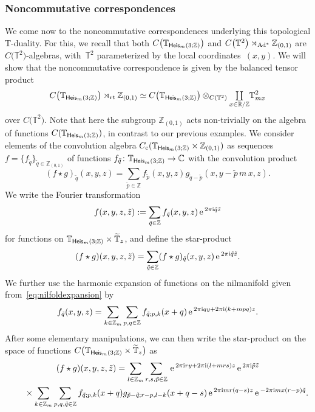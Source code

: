 \documentclass[10pt,a4paper]{amsart}
\numberwithin{equation}{section}
\def\nn{\nonumber}
\newcommand{\Z}{\zed}
\def\ii{{{\rm i}}}
\newcommand{\Heis}{{\sf Heis}}
\newcommand{\rt}{{\rm rt}}
\newcommand{\mcoprod}{\mbox{$\coprod\limits_{x\in\R/\Z}$}}
\newcommand{\R}{\real}
\newcommand{\complex}{{\mathbb C}} %
\newcommand{\zed}{{\mathbb Z}} %
\newcommand{\real}{{\mathbb R}} %
\newcommand{\torus}{{\mathbb T}} %
\def\nn{\nonumber}
\def\e{{\,\rm e}\,}
\begin{document}
\subsubsection*{Noncommutative correspondences}

We come now to the noncommutative correspondences underlying this
topological T-duality. For this, we recall that both
$C\big(\torus_{\Heis_m(3;\Z)}\big)$ and $C\big(\torus^2\big)\rtimes_{{\rm Ad}^*}\Z_{(0,1)}$
are $C\big(\torus^2\big)$-algebras, with~$\torus^2$
parameterized by the local coordinates~$(x,y)$. We will show that the
noncommutative correspondence is given by the balanced tensor product
\[
C\big(\torus_{\Heis_m(3;\Z)}\big)\rtimes_\rt\Z_{(0,1)} \simeq
C\big(\torus_{\Heis_m(3;\Z)}\big)\otimes_{C(\torus^2)} \mcoprod \torus_{m x}^2
\]
over $C\big(\torus^2\big)$.
Note that here the subgroup $\Z_{(0,1)}$ acts non-trivially on the algebra
of functions $C(\torus_{\Heis_m(3;\Z)})$, in contrast to our previous examples. We consider elements of the convolution
algebra $
C_{\rm c}(\torus_{\Heis_m(3;\Z)}\times\Z_{(0,1)})$ as sequences $f=\{f_{\tilde q}\}_{\tilde q\in\Z_{(0,1)}}$ of functions
$f_{\tilde q}\colon \torus_{\Heis_m(3;\Z)}\to\complex$ with the convolution product
\[
(f\star g)_{\tilde q}(x,y,z) = \sum_{\tilde p\in\Z} f_{\tilde p}(x,y,z)
g_{\tilde q-\tilde p}(x,y-\tilde p\,m\,x,z) .
\]
We write the Fourier transformation
\[
f(x,y,z,\tilde z) := \sum_{\tilde q\in\Z} f_{\tilde q}(x,y,z)
\e^{2\pi\ii \tilde q \tilde z}
\]
for functions on $\torus_{\Heis_m(3;\Z)}\times\widetilde\torus_z$, and define the star-product
\[
(f\star g)(x,y,z,\tilde z) = \sum_{\tilde q\in\Z} (f\star
g)_{\tilde q}(x,y,z) \e^{2\pi\ii \tilde q \tilde z} .
\]
We further use the harmonic expansion of functions on the nilmanifold
given from~\eqref{eq:nilfoldexpansion} by
\[
f_{\tilde q}(x,y,z) = \sum_{k\in\Z_m} \sum_{p,q\in\Z} f_{\tilde
 q;p,k}(x+q) \e^{2\pi\ii q y+2\pi\ii (k+m p q) z} .
\]
After some elementary manipulations, we can then write the star-product on
the space of functions $C\big(\torus_{\Heis_m(3;\Z)}\times\widetilde\torus_z\big)$ as
\begin{gather}
(f\star g)(x,y,z,\tilde z) = \sum_{l\in\Z_m} \sum_{r,s,\tilde
 p\in\Z} \e^{2\pi\ii r y+2\pi\ii(l+m r s)z}
 \e^{2\pi\ii\tilde p \tilde z} \nn \\
 \qquad{} \times \sum_{k\in\Z_m}
 \sum_{p,q,\tilde q\in\Z}
 f_{\tilde q;p,k}(x+q)
 g_{\tilde p-\tilde
 q;r-p,l-k}(x+q-s) \e^{2\pi\ii
 mr(q-s)z}
 \e^{-2\pi\ii
 mx(r-p)\tilde q}.\label{eq:starprodNCcorr}
\end{gather}
\end{document}
